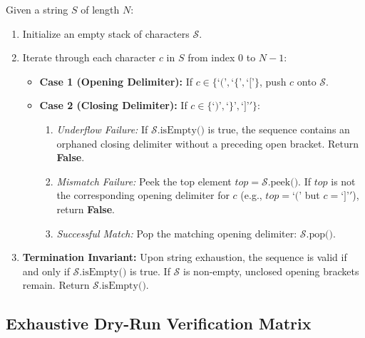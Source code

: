 \documentclass[10pt,journal,compsoc,onecolumn]{IEEEtran}
\begin{document}
Given a string $S$ of length $N$:
\begin{enumerate}
    \item Initialize an empty stack of characters $\mathcal{S}$.
    \item Iterate through each character $c$ in $S$ from index $0$ to $N - 1$:
    \begin{itemize}
        \item \textbf{Case 1 (Opening Delimiter):} If $c \in \{ \text{`('}, \text{`\{'}, \text{`['} \}$, push $c$ onto $\mathcal{S}$.
        \item \textbf{Case 2 (Closing Delimiter):} If $c \in \{ \text{`)'}, \text{`\}'}, \text{`]'}' \}$:
        \begin{enumerate}
            \item \emph{Underflow Failure:} If $\mathcal{S}\text{.isEmpty()}$ is true, the sequence contains an orphaned closing delimiter without a preceding open bracket. Return \textbf{False}.
            \item \emph{Mismatch Failure:} Peek the top element $top = \mathcal{S}\text{.peek()}$. If $top$ is not the corresponding opening delimiter for $c$ (e.g., $top = \text{`('}$ but $c = \text{`]'}'$), return \textbf{False}.
            \item \emph{Successful Match:} Pop the matching opening delimiter: $\mathcal{S}\text{.pop()}$.
        \end{enumerate}
    \end{itemize}
    \item \textbf{Termination Invariant:} Upon string exhaustion, the sequence is valid if and only if $\mathcal{S}\text{.isEmpty()}$ is true. If $\mathcal{S}$ is non-empty, unclosed opening brackets remain. Return $\mathcal{S}\text{.isEmpty()}$.
\end{enumerate}

\subsection{Exhaustive Dry-Run Verification Matrix}
\end{document}
